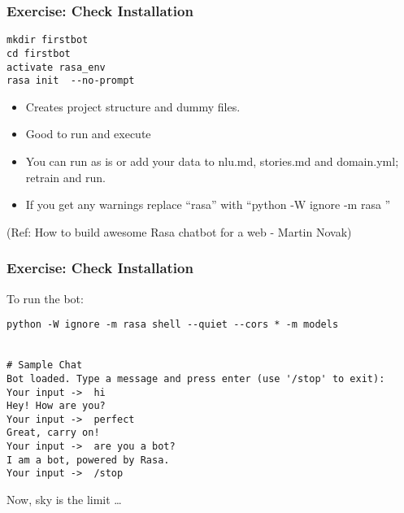  \begin{frame}[fragile]\frametitle{Exercise: Check Installation}

\begin{lstlisting}
mkdir firstbot
cd firstbot
activate rasa_env
rasa init  --no-prompt
\end{lstlisting}

\begin{itemize}
\item Creates project structure and dummy files. 
\item Good to run and execute
\item You can run as is or add your data to nlu.md, stories.md and domain.yml; retrain and run.
\item If you get any warnings replace ``rasa'' with ``python -W ignore -m rasa ''
\end{itemize}

{\tiny (Ref: How to build awesome Rasa chatbot for a web - Martin Novak)}

\end{frame}

 \begin{frame}[fragile]\frametitle{Exercise: Check Installation}

To run the bot:

\begin{lstlisting}
python -W ignore -m rasa shell --quiet --cors * -m models 


# Sample Chat
Bot loaded. Type a message and press enter (use '/stop' to exit):
Your input ->  hi
Hey! How are you?
Your input ->  perfect
Great, carry on!
Your input ->  are you a bot?
I am a bot, powered by Rasa.
Your input ->  /stop
\end{lstlisting}

Now, sky is the limit \ldots
\end{frame}




